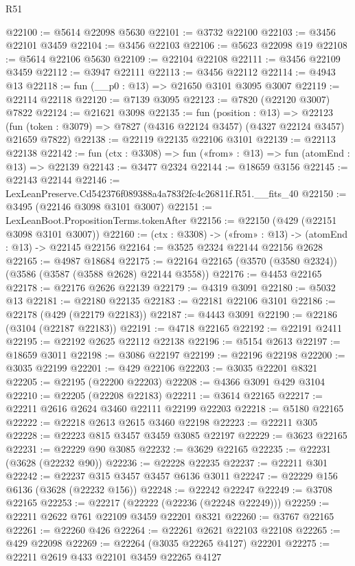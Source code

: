 \begin{lexlean}{R51}
\begin{coremodule}
@22100 := @5614 @22098 @5630
@22101 := @3732 @22100
@22103 := @3456 @22101 @3459
@22104 := @3456 @22103
@22106 := @5623 @22098 @19
@22108 := @5614 @22106 @5630
@22109 := @22104 @22108
@22111 := @3456 @22109 @3459
@22112 := @3947 @22111
@22113 := @3456 @22112
@22114 := @4943 @13
@22118 := fun (__p0 : @13) => @21650 @3101 @3095 @3007
@22119 := @22114 @22118
@22120 := @7139 @3095
@22123 := @7820 (@22120 @3007) @7822
@22124 := @21621 @3098
@22135 := fun (position : @13) =>
  @22123 (fun (token : @3079) => @7827 (@4316 @22124 @3457) (@4327 @22124 @3457) @21659 @7822)
@22138 := @22119 @22135 @22106 @3101
@22139 := @22113 @22138
@22142 := fun (ctx : @3308) => fun («from» : @13) => fun (atomEnd : @13) => @22139
@22143 := @3477 @2324
@22144 := @18659 @3156
@22145 := @22143 @22144
@22146 := LexLeanPreserve.Cd542376f089388a4a783f2fc4c26811f.R51.__fits_40
@22150 := @3495 (@22146 @3098 @3101 @3007)
@22151 := LexLeanBoot.PropositionTerms.tokenAfter
@22156 := @22150 (@429 (@22151 @3098 @3101 @3007))
@22160 := (ctx : @3308) -> («from» : @13) -> (atomEnd : @13) -> @22145 @22156
@22164 := @3525 @2324 @22144 @22156 @2628
@22165 := @4987 @18684
@22175 := @22164 @22165 (@3570 (@3580 @2324)) (@3586 (@3587 (@3588 @2628) @22144 @3558))
@22176 := @4453 @22165
@22178 := @22176 @2626 @22139
@22179 := @4319 @3091
@22180 := @5032 @13
@22181 := @22180 @22135
@22183 := @22181 @22106 @3101
@22186 := @22178 (@429 (@22179 @22183))
@22187 := @4443 @3091
@22190 := @22186 (@3104 (@22187 @22183))
@22191 := @4718 @22165
@22192 := @22191 @2411
@22195 := @22192 @2625 @22112 @22138
@22196 := @5154 @2613
@22197 := @18659 @3011
@22198 := @3086 @22197
@22199 := @22196 @22198
@22200 := @3035 @22199
@22201 := @429 @22106
@22203 := @3035 @22201 @8321
@22205 := @22195 (@22200 @22203)
@22208 := @4366 @3091 @429 @3104
@22210 := @22205 (@22208 @22183)
@22211 := @3614 @22165
@22217 := @22211 @2616 @2624 @3460 @22111 @22199 @22203
@22218 := @5180 @22165
@22222 := @22218 @2613 @2615 @3460 @22198
@22223 := @22211 @305
@22228 := @22223 @815 @3457 @3459 @3085 @22197
@22229 := @3623 @22165
@22231 := @22229 @90 @3085
@22232 := @3629 @22165
@22235 := @22231 (@3628 (@22232 @90))
@22236 := @22228 @22235
@22237 := @22211 @301
@22242 := @22237 @315 @3457 @3457 @6136 @3011
@22247 := @22229 @156 @6136 (@3628 (@22232 @156))
@22248 := @22242 @22247
@22249 := @3708 @22165
@22253 := @22217 (@22222 (@22236 (@22248 @22249)))
@22259 := @22211 @2622 @761 @22109 @3459 @22201 @8321
@22260 := @3767 @22165
@22261 := @22260 @426
@22264 := @22261 @2621 @22103 @22108
@22265 := @429 @22098
@22269 := @22264 (@3035 @22265 @4127) @22201
@22275 := @22211 @2619 @433 @22101 @3459 @22265 @4127

\end{coremodule}
\end{lexlean}
